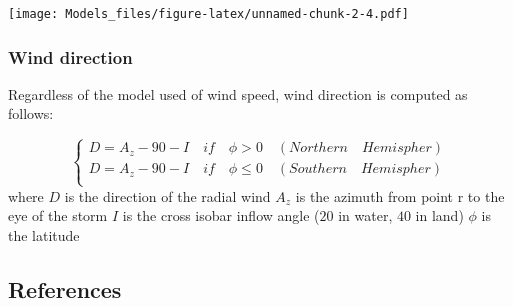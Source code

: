 \documentclass[
]{article}
\begin{document}
\texttt{[image: Models\_files/figure-latex/unnamed-chunk-2-4.pdf]}

\hypertarget{wind-direction}{%
\subsubsection{Wind direction}\label{wind-direction}}

Regardless of the model used of wind speed, wind direction is computed
as follows:

\[
\left\{
\begin{aligned}
D = A_z - 90 - I \quad if \quad \phi > 0 \quad(Northern \quad Hemispher) \\
D = A_z - 90 - I \quad if \quad \phi \leq 0 \quad(Southern \quad Hemispher) \\
\end{aligned}
\right.
\] where \(D\) is the direction of the radial wind \(A_z\) is the
azimuth from point r to the eye of the storm \(I\) is the cross isobar
inflow angle (\(20\) in water, \(40\) in land) \(\phi\) is the latitude

\hypertarget{references}{%
\subsection{References}\label{references}}
\end{document}
